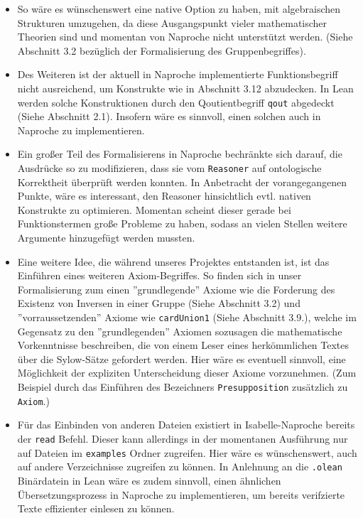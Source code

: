 \documentclass[a4paper,12pt]{scrartcl}
\begin{document}
\begin{itemize}
\item So wäre es wünschenswert eine native Option zu haben, mit algebraischen Strukturen umzugehen, da diese Ausgangspunkt vieler mathematischer Theorien sind und momentan von Naproche nicht unterstützt werden. (Siehe Abschnitt 3.2 bezüglich der Formalisierung des Gruppenbegriffes).

\item Des Weiteren ist der aktuell in Naproche implementierte Funktionsbegriff nicht ausreichend, um Konstrukte wie in Abschnitt 3.12 abzudecken. In Lean werden solche Konstruktionen durch den Qoutientbegriff \verb!qout! abgedeckt (Siehe Abschnitt 2.1). Insofern wäre es sinnvoll, einen solchen auch in Naproche zu implementieren.

\item Ein großer Teil des Formalisierens in Naproche bechränkte sich darauf, die Ausdrücke so zu modifizieren, dass sie vom \verb!Reasoner! auf ontologische Korrektheit überprüft werden konnten. In Anbetracht der vorangegangenen Punkte, wäre es interessant, den Reasoner hinsichtlich evtl. nativen Konstrukte zu optimieren. Momentan scheint dieser gerade bei Funktionstermen große Probleme zu haben, sodass an vielen Stellen weitere Argumente hinzugefügt werden mussten.

\item Eine weitere Idee, die während unseres Projektes entstanden ist, ist das Einführen eines weiteren Axiom-Begriffes. So finden sich in unser Formalisierung zum einen ''grundlegende'' Axiome wie die Forderung des Existenz von Inversen in einer Gruppe (Siehe Abschnitt 3.2) und ''vorraussetzenden'' Axiome wie \verb!cardUnion1! (Siehe Abschnitt 3.9.), welche im Gegensatz zu den ''grundlegenden'' Axiomen sozusagen die mathematische Vorkenntnisse beschreiben, die von einem Leser eines herkömmlichen Textes über die Sylow-Sätze gefordert werden. Hier wäre es eventuell sinnvoll, eine Möglichkeit der expliziten Unterscheidung dieser Axiome vorzunehmen. (Zum Beispiel durch das Einführen des Bezeichners \verb!Presupposition! zusätzlich zu \verb!Axiom!.)

\item Für das Einbinden von anderen Dateien existiert in Isabelle-Naproche bereits der \verb!read! Befehl. Dieser kann allerdings in der momentanen Ausführung nur auf Dateien im \verb!examples! Ordner zugreifen.
Hier wäre es wünschenswert, auch auf andere Verzeichnisse zugreifen zu können. In Anlehnung an die \verb!.olean! Binärdatein in Lean wäre es zudem sinnvoll, einen ähnlichen Übersetzungsprozess in Naproche zu implementieren, um bereits verifzierte Texte effizienter einlesen zu können.


\end{itemize}
\end{document}
